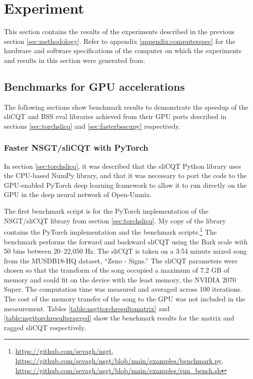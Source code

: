 \documentclass[report.tex]{subfiles}
\begin{document}
\section{Experiment}
\label{sec:experiment}

This section contains the results of the experiments described in the previous section \ref{sec:methodology}. Refer to appendix \ref{appendix:computerspec} for the hardware and software specifications of the computer on which the experiments and results in this section were generated from.

\subsection{Benchmarks for GPU accelerations}

The following sections show benchmark results to demonstrate the speedup of the sliCQT and BSS eval libraries achieved from their GPU ports described in sections \ref{sec:torchslicq} and \ref{sec:fasterbsscupy} respectively.

\subsubsection{Faster NSGT/sliCQT with PyTorch}

In section \ref{sec:torchslicq}, it was described that the sliCQT Python library uses the CPU-based NumPy library, and that it was necessary to port the code to the GPU-enabled PyTorch deep learning framework to allow it to run directly on the GPU in the deep neural network of Open-Unmix.

The first benchmark script is for the PyTorch implementation of the NSGT/sliCQT library from section \ref{sec:torchslicq}. My copy of the library contains the PyTorch implementation and the benchmark scripts.\footnote{\url{https://github.com/sevagh/nsgt}, \url{https://github.com/sevagh/nsgt/blob/main/examples/benchmark.py}, \url{https://github.com/sevagh/nsgt/blob/main/examples/run_bench.sh}} The benchmark performs the forward and backward sliCQT using the Bark scale with 50 bins between 20--22,050 Hz. The sliCQT is taken on a 3:54 minute mixed song from the MUSDB18-HQ dataset, ``Zeno - Signs.'' The sliCQT parameters were chosen so that the transform of the song occupied a maximum of 7.2 GB of memory and could fit on the device with the least memory, the NVIDIA 2070 Super. The computation time was measured and averaged across 100 iterations. The cost of the memory transfer of the song to the GPU was not included in the measurement. Tables \ref{table:nsgttorchresultsmatrix} and \ref{table:nsgttorchresultsragged} show the benchmark results for the matrix and ragged sliCQT respectively.
\end{document}
